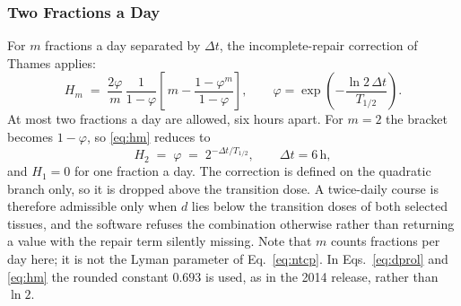 \documentclass[preprint,12pt,number]{elsarticle}
\begin{document}
\subsubsection{Two Fractions a Day}
For $m$ fractions a day separated by $\Delta t$, the incomplete-repair correction of Thames \cite{thames1985} applies:
    \begin{equation}
    H_m \;=\; \frac{2\varphi}{m}\,\frac{1}{1-\varphi} \left[\,m - \frac{1-\varphi^{m}}{1-\varphi}\right], \qquad \varphi = \exp\!\left(-\frac{\ln 2\,\Delta t}{T_{1/2}}\right).
    \label{eq:hm}
    \end{equation}
At most two fractions a day are allowed, six hours apart. For $m = 2$ the bracket becomes $1-\varphi$, so \eqref{eq:hm} reduces to
    \begin{equation}
    H_2 \;=\; \varphi \;=\; 2^{-\Delta t / T_{1/2}}, \qquad \Delta t = 6\,\mathrm{h},
    \label{eq:h2}
    \end{equation}
and $H_1 = 0$ for one fraction a day. The correction is defined on the quadratic branch only, so it is dropped above the transition dose. A twice-daily course is therefore admissible only when $d$ lies below the transition doses of both selected tissues, and the software refuses the combination otherwise rather than returning a value with the repair term silently missing. Note that $m$ counts fractions per day here; it is not the Lyman parameter of Eq.~\eqref{eq:ntcp}. In Eqs.~\eqref{eq:dprol} and \eqref{eq:hm} the rounded constant $0.693$ is used, as in the 2014 release, rather than $\ln 2$.
\end{document}
